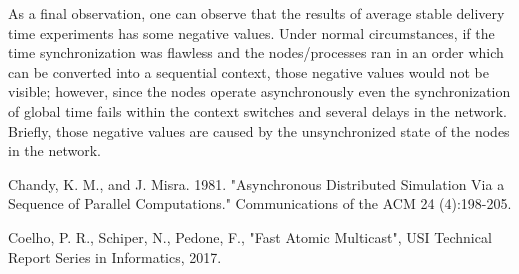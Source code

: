 \documentclass[a4paper, 12pt]{article}
\begin{document}
As a final observation, one can observe that the results of average stable delivery time experiments has some negative values. Under normal circumstances, if the time synchronization was flawless and the nodes/processes ran in an order which can be converted into a sequential context, those negative values would not be visible; however, since the nodes operate asynchronously even the synchronization of global time fails within the context switches and several delays in the network. Briefly, those negative values are caused by the unsynchronized state of the nodes in the network.

\begin{thebibliography}{99}

    Chandy, K. M., and J. Misra. 1981. "Asynchronous Distributed Simulation Via a Sequence of Parallel Computations." Communications of the ACM 24 (4):198-205.

    Coelho, P. R., Schiper, N., Pedone, F., "Fast Atomic Multicast", USI Technical Report Series in Informatics, 2017.

\end{thebibliography}
\end{document}
